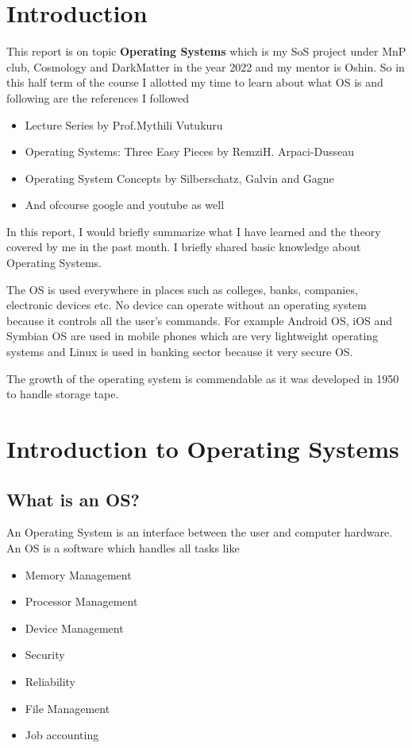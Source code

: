 \documentclass{article}
\begin{document}
\section{Introduction}
This report is on topic \textbf{Operating Systems} which is my SoS project under MnP club, Cosmology and DarkMatter in the year 2022 and my mentor is Oshin. So in this half term of the course I allotted my time to learn about what OS is and following are the references I followed
\begin{itemize}
    \item Lecture Series by Prof.Mythili Vutukuru
    \item Operating Systems: Three Easy Pieces by RemziH. Arpaci-Dusseau
    \item Operating System Concepts by Silberschatz, Galvin and Gagne
    \item And ofcourse google and youtube as well
\end{itemize}
In this report, I would briefly summarize what I have learned and the theory covered
by me in the past month. I briefly shared basic knowledge about Operating Systems.

The OS is used everywhere in places such as colleges, banks, companies, electronic devices etc. No device can operate without an operating system because it controls all the user's commands. For example Android OS, iOS and Symbian OS are used in mobile phones which are very lightweight operating systems and Linux is used in banking sector because it very secure OS.

The growth of the operating system is commendable as it was developed in 1950 to handle storage tape.
\section{Introduction to Operating Systems}
\subsection{What is an OS?}
An Operating System is an interface between the user and computer hardware. An OS is a software which handles all tasks like 
\begin{itemize}
    \item Memory Management
    \item Processor Management
    \item Device Management
    \item Security
    \item Reliability
    \item File Management
    \item Job accounting
\end{itemize}
\end{document}

